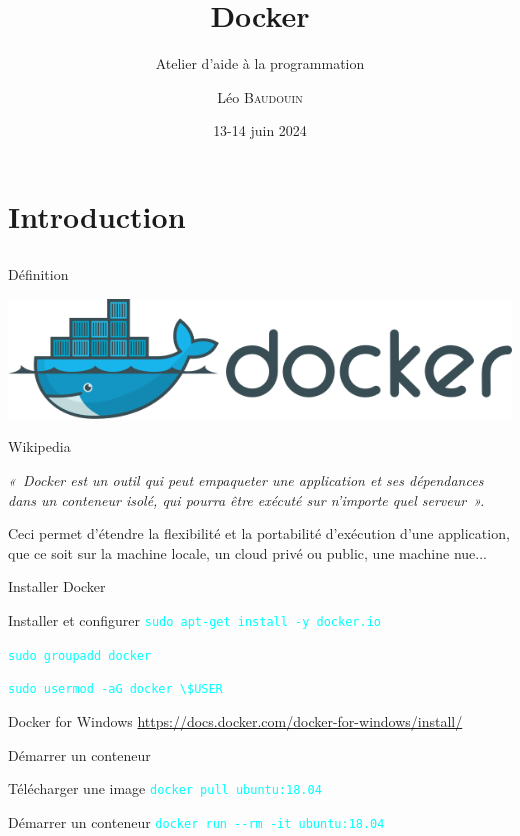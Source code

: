 \documentclass{beamer}
\title{Docker}
\subtitle{Atelier d'aide à la programmation}
\author{L\'eo \textsc{Baudouin}}
\institute{
  {\url{baudouin.leo @ gmail.com}}
}
\date{13-14 juin 2024}
\begin{document}
\begin{frame}
  \titlepage
\end{frame}

\section{Introduction}
\subsection{}

\begin{frame}{Définition}


\begin{center}
\includegraphics[width=0.5\linewidth]{images/docker-logo}
\end{center}

\begin{block}{Wikipedia}
{\it 
«~Docker est un outil qui peut empaqueter une application et ses dépendances dans un conteneur isolé, qui pourra être exécuté sur n'importe quel serveur~».

Ceci permet d'étendre la flexibilité et la portabilité d’exécution d'une application, que ce soit sur la machine locale, un cloud privé ou public, une machine nue...}
\end{block}
\end{frame}


\begin{frame}[fragile]{Installer Docker}

\begin{block}{Installer et configurer}
\textcolor{cyan}{\verb?sudo apt-get install -y docker.io?}

\textcolor{cyan}{\verb?sudo groupadd docker?}

\textcolor{cyan}{\verb?sudo usermod -aG docker \$USER?}
\end{block}

\begin{block}{Docker for Windows}
\href{https://docs.docker.com/docker-for-windows/install/}{https://docs.docker.com/docker-for-windows/install/}
\end{block}

\end{frame}


\begin{frame}{Démarrer un conteneur}

\begin{block}{Télécharger une image}
\textcolor{cyan}{\verb?docker pull ubuntu:18.04?}
\end{block}

\begin{block}{Démarrer un conteneur}
\textcolor{cyan}{\verb?docker run --rm -it ubuntu:18.04?}
\end{block}

\end{frame}
\end{document}
